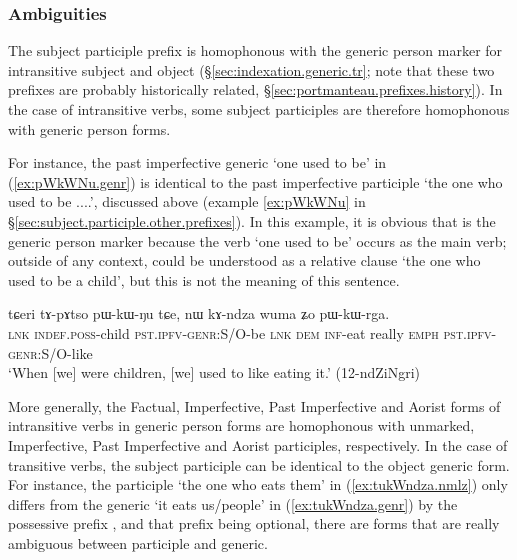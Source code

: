 \subsubsection{Ambiguities}  \label{sec:subject.participle.ambiguities}
The subject participle  prefix is homophonous with the generic person marker for intransitive subject and object (§\ref{sec:indexation.generic.tr}; note that these two prefixes are probably historically related, §\ref{sec:portmanteau.prefixes.history}). In the case of intransitive verbs, some subject participles are therefore homophonous with generic person forms. 

For instance, the past imperfective generic  `one used to be' in (\ref{ex:pWkWNu.genr}) is identical to the past imperfective participle  `the one who used to be ....', discussed above (example \ref{ex:pWkWNu} in §\ref{sec:subject.participle.other.prefixes}). In this example, it is obvious that  is the generic person marker because the verb  `one used to be' occurs as the main verb; outside of any context,   could be understood as a relative clause `the one who used to be a child', but this is not the meaning of this sentence. 

\begin{exe}
\ex \label{ex:pWkWNu.genr}
 \gll tɕeri tɤ-pɤtso pɯ-kɯ-ŋu tɕe, nɯ kɤ-ndza wuma ʑo pɯ-kɯ-rga. \\
 \textsc{lnk} \textsc{indef}.\textsc{poss}-child \textsc{pst}.\textsc{ipfv}-\textsc{genr}:S/O-be \textsc{lnk} \textsc{dem} \textsc{inf}-eat really \textsc{emph} \textsc{pst}.\textsc{ipfv}-\textsc{genr}:S/O-like \\
 \glt `When [we] were children, [we] used to like eating it.' (12-ndZiNgri) 
\end{exe}

More generally, the Factual, Imperfective, Past Imperfective and Aorist forms of intransitive verbs in generic person forms are homophonous with unmarked, Imperfective, Past Imperfective and Aorist participles, respectively. In the case of transitive verbs, the subject participle can be identical to the object generic form. For instance, the participle  `the one who eats them' in (\ref{ex:tukWndza.nmlz}) only differs from the generic  `it eats us/people' in  (\ref{ex:tukWndza.genr}) by the possessive prefix , and that prefix being optional, there are forms that are really ambiguous between participle and generic. 

